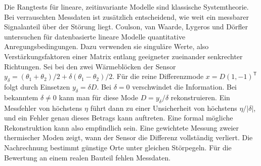 Die Rangtests für lineare, zeitinvariante Modelle sind klassische Systemtheorie. Bei verrauschten Messdaten ist zusätzlich entscheidend, wie weit ein messbarer Signalanteil über der Störung liegt. Coulson, van Waarde, Lygeros und Dörfler untersuchen für datenbasierte lineare Modelle quantitative Anregungsbedingungen. Dazu verwenden sie singuläre Werte, also Verstärkungsfaktoren einer Matrix entlang geeigneter zueinander senkrechter Richtungen.
Sei bei den zwei Wärmeblöcken der Sensor \(y_\delta=(\theta_1+\theta_2)/2+\delta(\theta_1-\theta_2)/2\). Für die reine Differenzmode \(x=D(1,-1)^\mathsf T\) folgt durch Einsetzen \(y_\delta=\delta D\). Bei \(\delta=0\) verschwindet die Information. Bei bekanntem \(\delta\ne0\) kann man für diese Mode \(D=y_\delta/\delta\) rekonstruieren. Ein Messfehler von höchstens \(\eta\) führt dann zu einer Unsicherheit von höchstens \(\eta/|\delta|\), und ein Fehler genau dieses Betrags kann auftreten. Eine formal mögliche Rekonstruktion kann also empfindlich sein.
Eine gewichtete Messung zweier thermischer Moden zeigt, wann der Sensor die Differenz vollständig verliert. Die Nachrechnung bestimmt günstige Orte unter gleichen Störpegeln. Für die Bewertung an einem realen Bauteil fehlen Messdaten.

